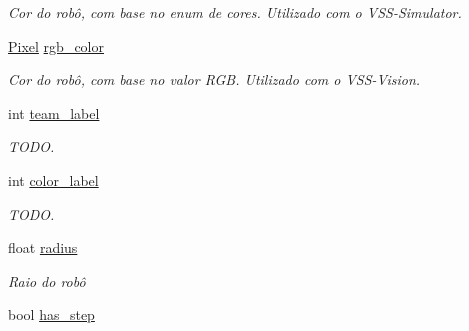 \begin{DoxyCompactItemize}
\begin{DoxyCompactList}\small\item\em Cor do robô, com base no enum de cores. Utilizado com o V\+S\+S-\/\+Simulator. \end{DoxyCompactList}\item 
\hyperlink{structcommon_1_1Pixel}{Pixel} \hyperlink{structcommon_1_1Robot_af2c38313d74d1b710b260e5ac903fab9}{rgb\+\_\+color}\hypertarget{structcommon_1_1Robot_af2c38313d74d1b710b260e5ac903fab9}{}\label{structcommon_1_1Robot_af2c38313d74d1b710b260e5ac903fab9}

\begin{DoxyCompactList}\small\item\em Cor do robô, com base no valor R\+GB. Utilizado com o V\+S\+S-\/\+Vision. \end{DoxyCompactList}\item 
int \hyperlink{structcommon_1_1Robot_a5f8ee844a4dc4a86d30a41c2a4100bfa}{team\+\_\+label}\hypertarget{structcommon_1_1Robot_a5f8ee844a4dc4a86d30a41c2a4100bfa}{}\label{structcommon_1_1Robot_a5f8ee844a4dc4a86d30a41c2a4100bfa}

\begin{DoxyCompactList}\small\item\em T\+O\+DO. \end{DoxyCompactList}\item 
int \hyperlink{structcommon_1_1Robot_a26877803f1772bb5cd5b0fabe8a9ee99}{color\+\_\+label}\hypertarget{structcommon_1_1Robot_a26877803f1772bb5cd5b0fabe8a9ee99}{}\label{structcommon_1_1Robot_a26877803f1772bb5cd5b0fabe8a9ee99}

\begin{DoxyCompactList}\small\item\em T\+O\+DO. \end{DoxyCompactList}\item 
float \hyperlink{structcommon_1_1Robot_a45485c8807aa375d14b7808ffef4adde}{radius}\hypertarget{structcommon_1_1Robot_a45485c8807aa375d14b7808ffef4adde}{}\label{structcommon_1_1Robot_a45485c8807aa375d14b7808ffef4adde}

\begin{DoxyCompactList}\small\item\em Raio do robô \end{DoxyCompactList}\item 
bool \hyperlink{structcommon_1_1Robot_a791ca826eed1f0ef29d5df539fdb2dad}{has\+\_\+step}\hypertarget{structcommon_1_1Robot_a791ca826eed1f0ef29d5df539fdb2dad}{}\label{structcommon_1_1Robot_a791ca826eed1f0ef29d5df539fdb2dad}


\end{DoxyCompactItemize}
